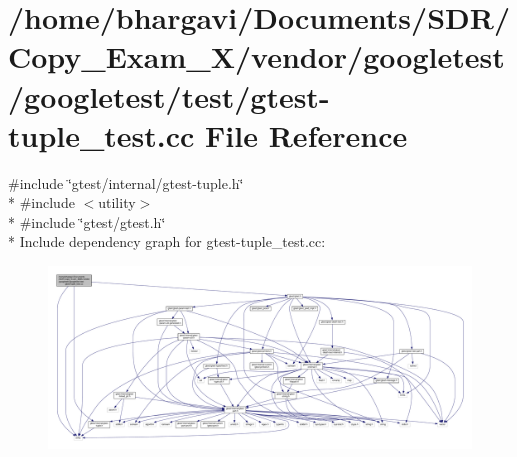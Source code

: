 \hypertarget{gtest-tuple__test_8cc}{}\section{/home/bhargavi/\+Documents/\+S\+D\+R/\+Copy\+\_\+\+Exam\+\_\+X/vendor/googletest/googletest/test/gtest-\/tuple\+\_\+test.cc File Reference}
\label{gtest-tuple__test_8cc}
{\ttfamily \#include \char`\"{}gtest/internal/gtest-\/tuple.\+h\char`\"{}}\\*
{\ttfamily \#include $<$utility$>$}\\*
{\ttfamily \#include \char`\"{}gtest/gtest.\+h\char`\"{}}\\*
Include dependency graph for gtest-\/tuple\+\_\+test.cc\+:
\nopagebreak
\begin{figure}[H]
\begin{center}
\leavevmode
\includegraphics[width=350pt]{gtest-tuple__test_8cc__incl}
\end{center}
\end{figure}
